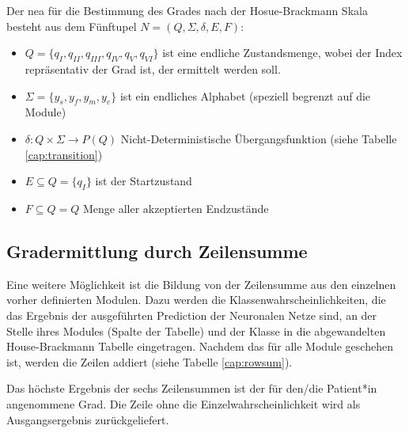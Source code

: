\vspace{1cm}
Der \ac{nea} für die Bestimmung des Grades nach der Hosue-Brackmann Skala besteht aus dem Fünftupel $N = (Q, \Sigma, \delta, E, F)$:

\begin{itemize}
  \setlength\itemsep{-0.5em}
\item $Q=\{ q_I, q_{II}, q_{III}, q_{IV}, q_{V}, q_{VI} \}$  ist eine endliche Zustandsmenge, wobei der Index repräsentativ der Grad ist, der ermittelt werden soll.
\item $\Sigma=\{ y_s, y_f, y_m, y_e \}$ ist ein endliches Alphabet (speziell begrenzt auf die Module)
\item $\delta:Q \times \Sigma \rightarrow P(Q)$ Nicht-Deterministische Übergangsfunktion (siehe Tabelle \ref{cap:transition})
\item $E \subseteq Q = \{ q_I \}$ ist der Startzustand
\item $F \subseteq Q = Q$ Menge aller akzeptierten Endzustände
\end{itemize}





\subsection{Gradermittlung durch Zeilensumme}\label{rowsum}
Eine weitere Möglichkeit ist die Bildung von der Zeilensumme aus den einzelnen vorher definierten Modulen. Dazu werden die Klassenwahrscheinlichkeiten, die das Ergebnis der ausgeführten Prediction der Neuronalen Netze sind, an der Stelle ihres Modules (Spalte der Tabelle) und der Klasse in die abgewandelten House-Brackmann Tabelle eingetragen. Nachdem das für alle Module geschehen ist, werden die Zeilen addiert (siehe Tabelle \ref{cap:rowsum}).

Das höchste Ergebnis der sechs Zeilensummen ist der für den/die Patient*in angenommene Grad. Die Zeile ohne die Einzelwahrscheinlichkeit wird als Ausgangsergebnis zurückgeliefert.

